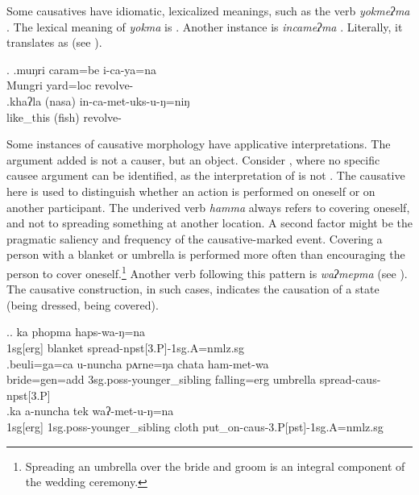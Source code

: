 Some causatives have idiomatic, lexicalized meanings, such as the verb \emph{yokmeʔma} . The lexical meaning of \emph{yokma} is . Another instance is \emph{incameʔma} . Literally, it translates as  (see \Next).

 
\ex. \ag.muŋri caram=be i-ca-ya=na\\
Mungri yard{\sc =loc} revolve-\\
\bg.khaʔla (nasa) in-ca-met-uks-u-ŋ=niŋ\\
	like\_this (fish) revolve-\\
	   
 

Some instances of causative morphology have applicative interpretations. The argument added is not a causer, but an object. Consider \Next, where no specific causee argument can be identified, as the interpretation of \Next[b] is not . The causative here is used to distinguish whether an action is performed on oneself or on another participant. The underived verb \emph{hamma}  always refers to covering oneself, and not to spreading something at another location. A second factor might be the pragmatic saliency and frequency of the causative-marked event. Covering a person with a blanket or umbrella is performed more often than encouraging the person to cover oneself.\footnote{Spreading an umbrella over the bride and groom is an integral component of the wedding ceremony.} Another verb following this pattern is  \emph{waʔmepma}  (see \Next[c]). The causative construction, in such cases, indicates the causation of a state (being dressed, being covered).  


\ex.\ag. ka phopma haps-wa-ŋ=na\\ 
{\sc 1sg[erg]} blanket spread{\sc -npst[3.P]-1sg.A=nmlz.sg}\\
\bg.beuli=ga=ca  u-nuncha pʌrne=ŋa   chata    ham-met-wa\\
bride{\sc =gen=add} {\sc 3sg.poss-}younger\_sibling falling{\sc =erg} umbrella spread{\sc -caus-npst[3.P]}\\
  
\bg.ka a-nuncha tek waʔ-met-u-ŋ=na\\
{\sc 1sg[erg]}  {\sc 1sg.poss-}younger\_sibling cloth put\_on{\sc -caus-3.P[pst]-1sg.A=nmlz.sg}\\


